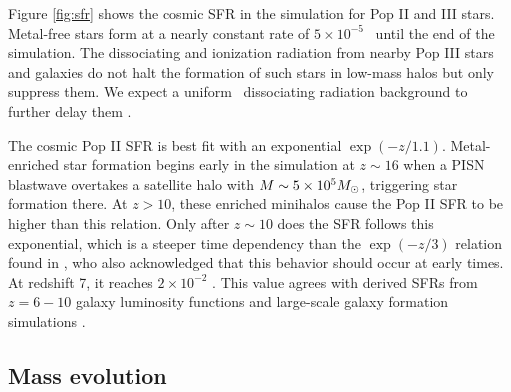 \documentclass[12pt,preprint]{aastex}
\begin{document}

Figure \ref{fig:sfr} shows the cosmic SFR in the simulation for Pop II
and III stars.  Metal-free stars form at a nearly constant rate of $5
\times 10^{-5}$ \sfr~until the end of the simulation.  The
dissociating and ionization radiation from nearby Pop III stars and
galaxies do not halt the formation of such stars in low-mass halos
but only suppress them.  We expect a uniform \hh~dissociating
radiation background to further delay them \citep{Machacek01, Wise07,
  OShea08}.

The cosmic Pop II SFR is best fit with an exponential $\exp(-z/1.1)$.
Metal-enriched star formation begins early in the simulation at $z
\sim 16$ when a PISN blastwave overtakes a satellite halo with $M \sim
5 \times 10^5 \Ms$, triggering star formation there.  At $z>10$, these
enriched minihalos cause the Pop II SFR to be higher than this
relation.  Only after $z \sim 10$ does the SFR follows this
exponential, which is a steeper time dependency than the $\exp(-z/3)$
relation found in \citet{Hernquist03}, who also acknowledged that this
behavior should occur at early times.  At redshift 7, it reaches $2
\times 10^{-2}$ \sfr.  This value agrees with derived SFRs from
$z=6-10$ galaxy luminosity functions \citep[e.g.][]{Bouwens11} and
large-scale galaxy formation simulations \citep[e.g.][]{Schaye10}.

\subsection{Mass evolution}
\label{sec:halo}



\begin{figure*}
\caption{\label{fig:evo} (a) Evolution of the total halo mass (top),
  stellar mass (middle), and gas fraction (bottom) of the quiet
  (dashed) and intense (solid) halos.  In the top panel, the filtering
  halo mass is plotted as the thick black line (overlapping with the
  quiet halo after $z=9$.  (b) Mass-weighted stellar metallicities and
  gas metallicities enriched by Pop II and Pop III SNe of the intense
  (top) and quiet (bottom) halos.}
\end{figure*}
\end{document}

